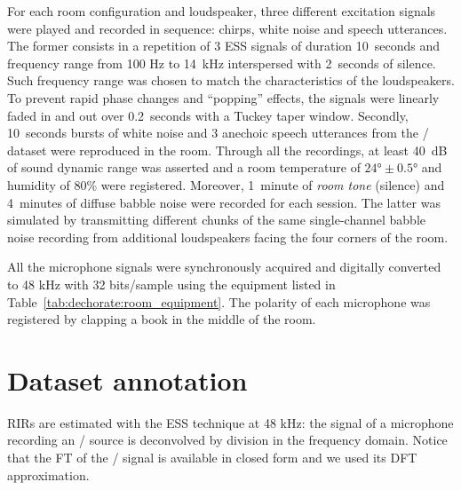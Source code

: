 \mynewline
For each room configuration and loudspeaker, three different excitation signals were played and recorded in sequence: chirps, white noise and speech utterances.
The former consists in a repetition of 3 \acf{ESS} signals of duration 10~seconds and frequency range from 100 Hz to 14~kHz interspersed with 2~seconds of silence.
Such frequency range was chosen to match the characteristics of the loudspeakers.
To prevent rapid phase changes and ``popping'' effects, the signals were linearly faded in and out over 0.2~seconds with a Tuckey taper window.
Secondly, 10~seconds bursts of white noise and 3 anechoic speech utterances from the \WSJ/ dataset  were reproduced in the room.
Through all the recordings, at least 40~dB of sound dynamic range was asserted and a room temperature of $\ang{24} \pm \ang{0.5}$ and humidity of 80\% were registered.
Moreover, 1~minute of \textit{room tone} (silence) and 4~minutes of diffuse babble noise were recorded for each session.
The latter was simulated by transmitting different chunks of the same single-channel babble noise recording from additional loudspeakers facing the four corners of the room.

\mynewline
All the microphone signals were synchronously acquired and digitally converted to 48 kHz with 32 bits/sample using the equipment listed in Table~\ref{tab:dechorate:room_equipment}. The polarity of each microphone was registered by clapping a book in the middle of the room.

\section{Dataset annotation}\label{sec:annotation}
\acp{RIR} are estimated with the ESS technique  at 48 kHz:
the signal of a microphone recording an \ESS/ source is deconvolved by division in the frequency domain.
Notice that the \ac{FT} of the \ESS/ signal is available in closed form and we used its \ac{DFT} approximation.

